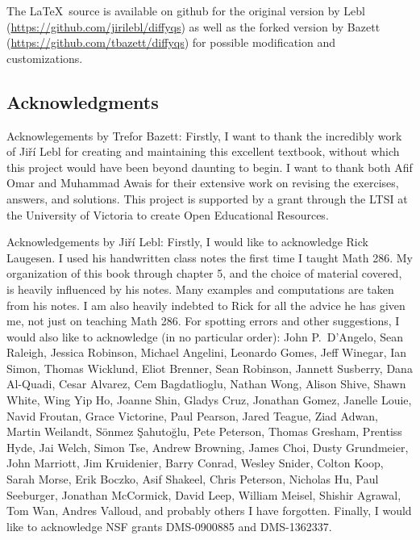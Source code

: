 The \LaTeX\ source is available on github for the original version by Lebl (\url{https://github.com/jirilebl/diffyqs}) as well as the forked version by Bazett (\url{https://github.com/tbazett/diffyqs}) for possible modification and customizations.

\subsection{Acknowledgments}



Acknowlegements by Trefor Bazett: Firstly, I want to thank the incredibly work of Ji\v{r}\'i Lebl for creating and maintaining this excellent textbook, without which this project would have been beyond daunting to begin. I want to thank both Afif Omar and Muhammad Awais for their extensive work on revising the exercises, answers, and solutions. This project is supported by a grant through the LTSI at the University of Victoria to create Open Educational Resources. 

Acknowledgements by Ji\v{r}\'i Lebl: Firstly, I would like to acknowledge Rick Laugesen.  I used his handwritten
class notes
the first time I taught
Math 286.  My organization of this book through chapter 5,
and the choice of
material covered, is heavily influenced by his notes.  Many
examples and computations are taken from his notes.  I am also heavily
indebted to Rick for all the advice he has given me, not just on teaching
Math 286.
For spotting errors and other suggestions,
I would also like to acknowledge (in no particular order):
John P.\ D'Angelo,
Sean Raleigh, Jessica Robinson, Michael Angelini, Leonardo Gomes, Jeff
Winegar, Ian Simon, Thomas Wicklund, Eliot Brenner, Sean Robinson,
Jannett Susberry, Dana Al-Quadi, Cesar Alvarez, Cem Bagdatlioglu,
Nathan Wong, Alison Shive, Shawn White, Wing Yip Ho, Joanne Shin,
Gladys Cruz, Jonathan Gomez, Janelle Louie, Navid Froutan,
Grace Victorine, Paul Pearson, Jared Teague, Ziad Adwan,
Martin Weilandt, S\"{o}nmez \c{S}ahuto\u{g}lu,
Pete Peterson, Thomas Gresham, Prentiss Hyde, Jai Welch,
Simon Tse, Andrew Browning, James Choi, Dusty Grundmeier,
John Marriott,
Jim Kruidenier,
Barry Conrad,
Wesley Snider,
Colton Koop,
Sarah Morse,
Erik Boczko,
Asif Shakeel,
Chris Peterson,
Nicholas Hu,
Paul Seeburger,
Jonathan McCormick,
David Leep,
William Meisel,
Shishir Agrawal,
Tom Wan,
Andres Valloud,
and probably others I
have forgotten.
Finally, I would like
to acknowledge NSF grants DMS-0900885 and DMS-1362337.



